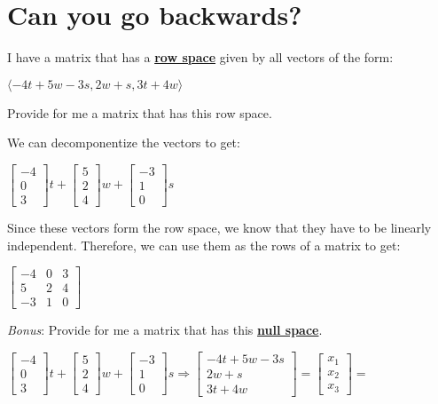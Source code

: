 \documentclass[
  letterpaper,
  DIV=11,
  numbers=noendperiod]{scrartcl}
\begin{document}
\hypertarget{can-you-go-backwards}{%
\section{Can you go backwards?}\label{can-you-go-backwards}}

I have a matrix that has a \ul{\textbf{row space}} given by all vectors
of the form:

\(\langle -4t + 5w - 3s, 2w + s, 3t + 4w \rangle\)

Provide for me a matrix that has this row space.

We can decomponentize the vectors to get:

\(\begin{bmatrix}-4 \\ 0 \\ 3\end{bmatrix}t + \begin{bmatrix}5 \\ 2 \\ 4\end{bmatrix}w + \begin{bmatrix}-3 \\ 1 \\ 0\end{bmatrix}s\)

Since these vectors form the row space, we know that they have to be
linearly independent. Therefore, we can use them as the rows of a matrix
to get:

\(\begin{bmatrix}-4 & 0 & 3 \\ 5 & 2 & 4 \\ -3 & 1 & 0\end{bmatrix}\)

\emph{Bonus}: Provide for me a matrix that has this \ul{\textbf{null
space}}.

\(\begin{bmatrix}-4 \\ 0 \\ 3\end{bmatrix}t + \begin{bmatrix}5 \\ 2 \\ 4\end{bmatrix}w + \begin{bmatrix}-3 \\ 1 \\ 0\end{bmatrix}s \Rightarrow \begin{bmatrix}-4t+5w-3s \\ 2w + s \\ 3t + 4w\end{bmatrix}=\begin{bmatrix}x_1 \\ x_2 \\ x_3\end{bmatrix} =\)
\end{document}
